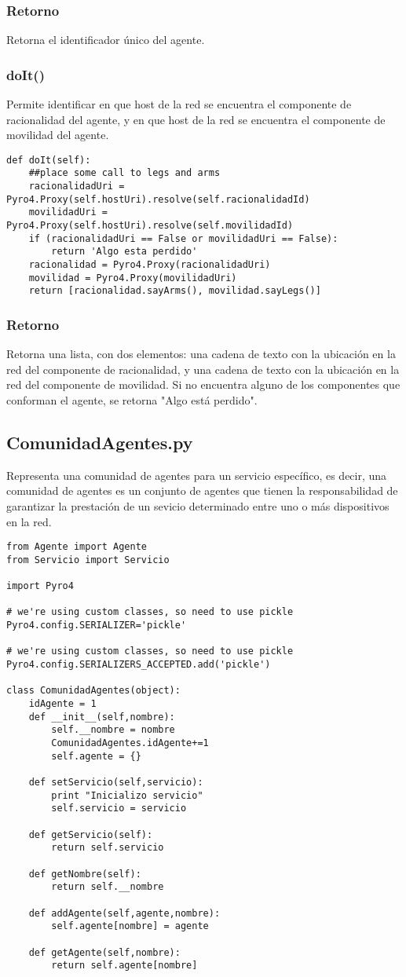 \documentclass{article}
\begin{document}
\subsubsection*{Retorno}
Retorna el identificador único del agente.
\subsubsection{\textbf{doIt}()}
Permite identificar en que host de la red se encuentra el componente de racionalidad del agente, y en que host de la red se encuentra el componente de movilidad del agente.
\begin{lstlisting}
def doIt(self):
	##place some call to legs and arms
	racionalidadUri = Pyro4.Proxy(self.hostUri).resolve(self.racionalidadId)
	movilidadUri =  Pyro4.Proxy(self.hostUri).resolve(self.movilidadId)
	if (racionalidadUri == False or movilidadUri == False):
		return 'Algo esta perdido'
	racionalidad = Pyro4.Proxy(racionalidadUri)
	movilidad = Pyro4.Proxy(movilidadUri)
	return [racionalidad.sayArms(), movilidad.sayLegs()]
\end{lstlisting}
\subsubsection*{Retorno}
Retorna una lista, con dos elementos: una cadena de texto con la ubicación en la red del componente de racionalidad, y una cadena de texto con la ubicación en la red del componente de movilidad. Si no encuentra alguno de los componentes que conforman el agente, se retorna "Algo está perdido".
\subsection{ComunidadAgentes.py}
Representa una comunidad de agentes para un servicio específico, es decir, una comunidad de agentes es un conjunto de agentes que tienen la responsabilidad de garantizar la prestación de un sevicio determinado entre uno o más dispositivos en la red.
\begin{lstlisting}
from Agente import Agente
from Servicio import Servicio

import Pyro4

# we're using custom classes, so need to use pickle
Pyro4.config.SERIALIZER='pickle'

# we're using custom classes, so need to use pickle
Pyro4.config.SERIALIZERS_ACCEPTED.add('pickle')

class ComunidadAgentes(object):
    idAgente = 1
    def __init__(self,nombre):
        self.__nombre = nombre
        ComunidadAgentes.idAgente+=1
        self.agente = {}
        
    def setServicio(self,servicio):
        print "Inicializo servicio"
        self.servicio = servicio
        
    def getServicio(self):
        return self.servicio
        
    def getNombre(self):
        return self.__nombre
        
    def addAgente(self,agente,nombre):
        self.agente[nombre] = agente
        
    def getAgente(self,nombre):
        return self.agente[nombre]
\end{lstlisting}
\end{document}
